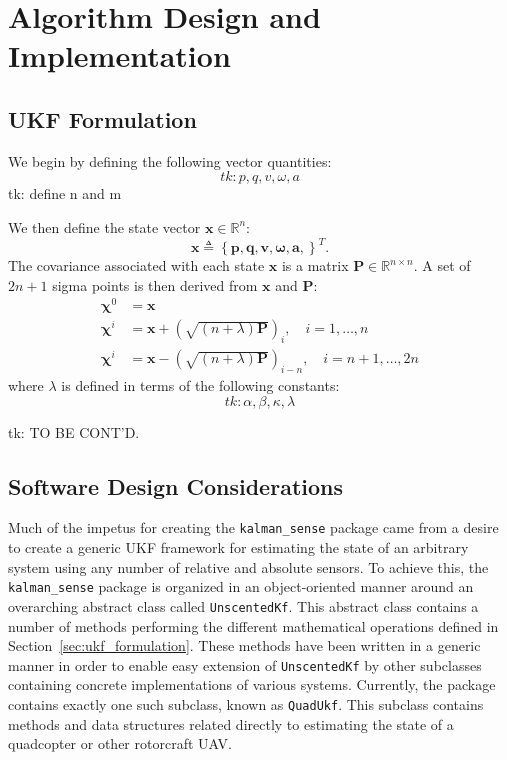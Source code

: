 \chapter{Algorithm Design and Implementation} \label{ch:alg_design}

\section{UKF Formulation}

We begin by defining the following vector quantities:
%
\begin{equation}
tk: p, q, v, \omega, a
\end{equation}
%
tk: define n and m


We then define the state vector $\mathbf{x} \in \mathbb{R}^{n}$:
%
\begin{equation}
\mathbf{x} \triangleq \left\lbrace
\mathbf{p},
\mathbf{q},
\mathbf{v},
\mathbf{\omega},
\mathbf{a},
\right\rbrace ^{T}.
\end{equation}
%
The covariance associated with each state $\mathbf{x}$ is a matrix $\mathbf{P} \in \mathbb{R}^{n \times n}$. A set of $2n + 1$ sigma points is then derived from $\mathbf{x}$ and $\mathbf{P}$:
%
\begin{align}
\mathbf{\chi}^{0} &= \mathbf{x} \nonumber\\
\mathbf{\chi}^{i} &= \mathbf{x} + \left( \sqrt{\left( n + \lambda \right) \mathbf{P} } \right)_{i}, \quad i = 1, \dots, n \\
\mathbf{\chi}^{i} &= \mathbf{x} - \left( \sqrt{\left( n + \lambda \right) \mathbf{P} } \right)_{i-n}, \quad i = n+1, \dots, 2n \nonumber
\end{align}
%
where $\lambda$ is defined in terms of the following constants:
%
\begin{equation}
tk: \alpha, \beta, \kappa, \lambda
\end{equation}

tk: TO BE CONT'D.

\section{Software Design Considerations}

Much of the impetus for creating the \texttt{kalman\_sense} package came from a desire to create a generic UKF framework for estimating the state of an arbitrary system using any number of relative and absolute sensors. To achieve this, the \texttt{kalman\_sense} package is organized in an object-oriented manner around an overarching abstract class called \texttt{UnscentedKf}. This abstract class contains a number of methods performing the different mathematical operations defined in Section~\ref{sec:ukf_formulation}. These methods have been written in a generic manner in order to enable easy extension of \texttt{UnscentedKf} by other subclasses containing concrete implementations of various systems. Currently, the package contains exactly one such subclass, known as \texttt{QuadUkf}. This subclass contains methods and data structures related directly to estimating the state of a quadcopter or other rotorcraft UAV.


